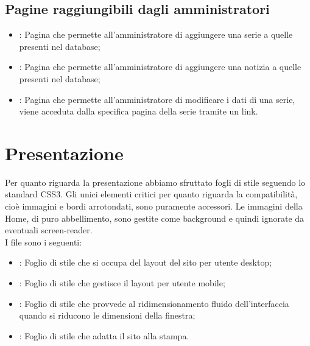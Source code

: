 \documentclass{tecweb}
\begin{document}
	\subsection{Pagine raggiungibili dagli amministratori}
	\begin{itemize}
		\item {}: Pagina che permette all'amministratore di aggiungere una serie a quelle presenti nel database;
		\item {}: Pagina che permette all'amministratore di aggiungere una notizia a quelle presenti nel database;
		\item {}: Pagina che permette all'amministratore di modificare i dati di una serie, viene acceduta dalla specifica pagina della serie tramite un link.
	\end{itemize}
	\newpage
	\section{Presentazione}
	Per quanto riguarda la presentazione abbiamo sfruttato fogli di stile seguendo lo standard CSS3. Gli unici elementi critici per quanto riguarda la compatibilità, cioè immagini e bordi arrotondati, sono puramente accessori. Le immagini della Home, di puro abbellimento, sono gestite come background e quindi ignorate da eventuali screen-reader.\\
	I file  sono i seguenti:
	\begin{itemize}
		\item {}: Foglio di stile che si occupa del layout del sito per utente desktop;
		\item {}: Foglio di stile che gestisce il layout per utente mobile;
		\item {}: Foglio di stile che provvede al ridimensionamento fluido dell'interfaccia quando si riducono le dimensioni della finestra;
		\item {}: Foglio di stile che adatta il sito alla stampa.		
	\end{itemize}
	\newpage
\end{document}
